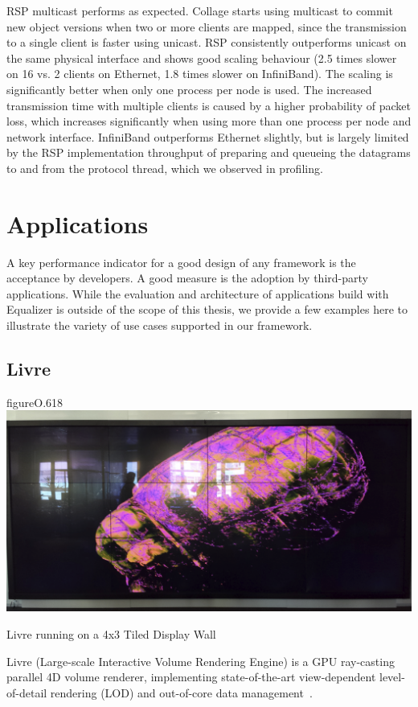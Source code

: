 RSP multicast performs as expected. Collage starts using multicast to commit
new object versions when two or more clients are mapped, since the transmission
to a single client is faster using unicast. RSP consistently outperforms
unicast on the same physical interface and shows good scaling behaviour (2.5
times slower on 16 vs. 2 clients on Ethernet, 1.8 times slower on InfiniBand).
The scaling is significantly better when only one process per node is used. The
increased transmission time with multiple clients is caused by a higher
probability of packet loss, which increases significantly when using more than
one process per node and network interface. InfiniBand outperforms Ethernet
slightly, but is largely limited by the RSP implementation throughput of
preparing and queueing the datagrams to and from the protocol thread, which we
observed in profiling.


\chapter{Applications}\label{sApplications}

A key performance indicator for a good design of any framework is the
acceptance by developers. A good measure is the adoption by third-party
applications. While the evaluation and architecture of applications build with
Equalizer is outside of the scope of this thesis, we provide a few examples
here to illustrate the variety of use cases supported in our framework.

\section{Livre}

\begin{wrapfloat}{figure}{O}{.618\textwidth}
  \includegraphics[width=.618\textwidth]{images/livre}
  {\caption{\label{fLivre}Livre running on a 4x3 Tiled Display Wall}}
\end{wrapfloat}

Livre (Large-scale Interactive Volume Rendering Engine) is a GPU ray-casting
parallel 4D volume renderer, implementing state-of-the-art view-dependent
level-of-detail rendering (LOD) and out-of-core data
management~\cite{EHKRW:06}.

